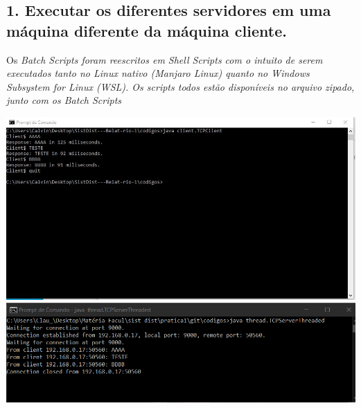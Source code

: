 \subsection*{1. Executar os diferentes servidores em uma máquina diferente da
máquina cliente.}

Os \it{Batch Scripts} foram reescritos em Shell Scripts com o intuito de serem executados tanto no Linux nativo (Manjaro Linux) quanto no Windows Subsystem for Linux (WSL). Os scripts todos estão disponíveis no arquivo zipado, junto com os Batch Scripts

\vspace{2em}
\begin{minipage}{\textwidth}
    \hspace{-1em}
    \centering
    \includegraphics[trim= 0 200 250 0, clip, scale=.4] {prints/terminal-cilente-threaded.JPG}
    \includegraphics[scale=.4]{prints/terminal-server-threaded.PNG}
    \label{threadspng}
    \hspace{1em}
\end{minipage}
\vspace{0.5em}

